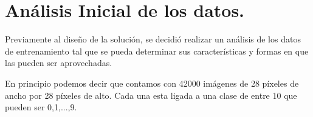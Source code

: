 \chapter{Análisis Inicial de los datos.}
Previamente al diseño de la solución, se decidió realizar un análisis de los datos de entrenamiento tal que se pueda determinar sus características y formas en que las pueden ser aprovechadas.

En principio podemos decir que contamos con 42000 imágenes de 28 píxeles de ancho por 28 píxeles de alto. Cada una esta ligada a una clase de entre 10 que pueden ser 0,1,...,9. 
